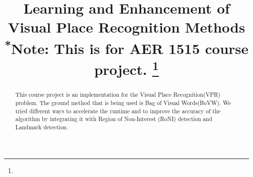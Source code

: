 \documentclass[conference]{IEEEtran}
\begin{document}
\title{Learning and Enhancement of Visual Place Recognition Methods\\
{\footnotesize \textsuperscript{*}Note: This is for AER 1515 course project.}
\thanks{
}
}

\author{
\and
{}
}

\maketitle

\begin{abstract}
This course project is an implementation for the Visual Place Recognition(VPR) problem. The ground method that is being used is Bag of Visual Words(BoVW). We tried different ways to accelerate the runtime and to improve the accuracy of the algorithm by integrating it with Region of Non-Interest (RoNI) detection and Landmark detection.\\
\end{abstract}
\end{document}
